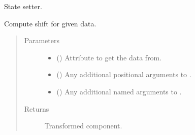 \documentclass[letterpaper,10pt,english]{sphinxmanual}
\begin{document}
\begin{fulllineitems}
\begin{fulllineitems}
\begin{quote}
\begin{description}
\end{description}\end{quote}

\end{fulllineitems}


\begin{fulllineitems}
\label{\detokenize{api/states:geology.src.States.set_state}}
State setter.

\end{fulllineitems}


\begin{fulllineitems}
\label{\detokenize{api/states:geology.src.States.shift}}
Compute shift for given data.
\begin{quote}\begin{description}
\item[{Parameters}] \leavevmode\begin{itemize}
\item {} 
 (\sphinxstyleliteralemphasis{\sphinxupquote{, }}) \textendash{} Attribute to get the data from.

\item {} 
 () \textendash{} Any additional positional arguments to .

\item {} 
 () \textendash{} Any additional named arguments to .

\end{itemize}

\item[{Returns}] \leavevmode
{} \textendash{} Transformed component.


\end{description}
\end{quote}
\end{fulllineitems}
\end{fulllineitems}
\end{document}
